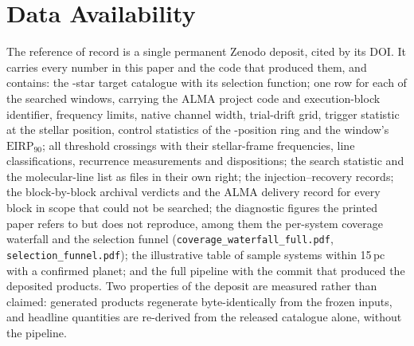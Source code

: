 \section*{Data Availability}
\label{sec:data}
The reference of record is a single permanent Zenodo deposit, cited by its
DOI. It carries every number in this paper and the code that produced them,
and contains: the \NStars-star target catalogue with its selection
function; one row for each of the \NWindows{} searched windows, carrying
the ALMA project code and execution-block identifier, frequency limits,
native channel width, trial-drift grid, trigger statistic at the stellar
position, control statistics of the \NCtrl-position ring and the window's
$\mathrm{EIRP}_{90}$; all \NCross{} threshold crossings with their
stellar-frame frequencies, line classifications, recurrence measurements
and dispositions; the search statistic and the molecular-line list as files
in their own right; the injection--recovery records; the block-by-block
archival verdicts and the ALMA delivery record for every block in scope
that could not be searched; the diagnostic figures the printed paper refers
to but does not reproduce, among them the per-system coverage waterfall and
the selection funnel (\texttt{coverage\_waterfall\_full.pdf},
\texttt{selection\_funnel.pdf}); the illustrative table of sample systems
within 15\,pc with a confirmed planet; and the full pipeline with the
commit that produced the deposited products. Two properties of the deposit are
measured rather than claimed: \NRegenProducts{} generated products
regenerate byte-identically from the frozen inputs, and \NReproChecks{}
headline quantities are re-derived from the released catalogue alone,
without the pipeline.

